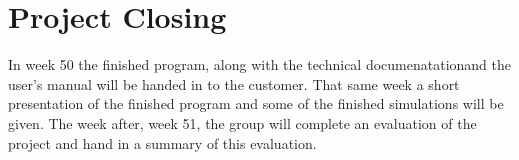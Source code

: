\section{Project Closing}
In week 50 the finished program, along with the technical documenatationand the
user's manual will be handed in to the customer. That same week a short
presentation of the finished program and some of the finished simulations will
be given. The week after, week 51, the group will complete an evaluation of the
project and hand in a summary of this evaluation.
